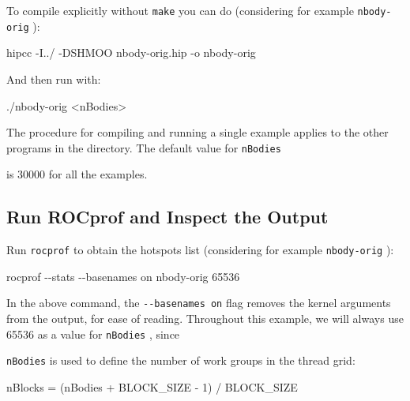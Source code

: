\documentclass[
]{article}
\let\oldtexttt\texttt
\renewcommand{\texttt}[1]{
  \colorbox{Light}{\oldtexttt{#1}}
}
\newenvironment{Shaded}{}{}
\newcommand{\ExtensionTok}[1]{#1}
\newcommand{\NormalTok}[1]{#1}
\newcommand{\OperatorTok}[1]{\textcolor[rgb]{0.40,0.40,0.40}{#1}}
\begin{document}
To compile explicitly without \texttt{make} you can do (considering for
example \texttt{nbody-orig}):

\begin{Shaded}
\begin{Highlighting}[]
\ExtensionTok{hipcc}\NormalTok{ {-}I../ {-}DSHMOO nbody{-}orig.hip {-}o nbody{-}orig}
\end{Highlighting}
\end{Shaded}

And then run with:

\begin{Shaded}
\begin{Highlighting}[]
\ExtensionTok{./nbody{-}orig} \OperatorTok{\textless{}}\NormalTok{nBodies}\OperatorTok{\textgreater{}}
\end{Highlighting}
\end{Shaded}

The procedure for compiling and running a single example applies to the
other programs in the directory. The default value for \texttt{nBodies}
is 30000 for all the examples.

\hypertarget{run-rocprof-and-inspect-the-output}{%
\subsection{Run ROCprof and Inspect the
Output}\label{run-rocprof-and-inspect-the-output}}

Run \texttt{rocprof} to obtain the hotspots list (considering for
example \texttt{nbody-orig}):

\begin{Shaded}
\begin{Highlighting}[]
\ExtensionTok{rocprof}\NormalTok{ {-}{-}stats {-}{-}basenames on nbody{-}orig 65536}
\end{Highlighting}
\end{Shaded}

In the above command, the \texttt{-\/-basenames\ on} flag removes the
kernel arguments from the output, for ease of reading. Throughout this
example, we will always use 65536 as a value for \texttt{nBodies}, since
\texttt{nBodies} is used to define the number of work groups in the
thread grid:

\begin{Shaded}
\begin{Highlighting}[]
\ExtensionTok{nBlocks}\NormalTok{ = (nBodies + BLOCK\_SIZE {-} 1) }\ExtensionTok{/}\NormalTok{ BLOCK\_SIZE}
\end{Highlighting}
\end{Shaded}
\end{document}
